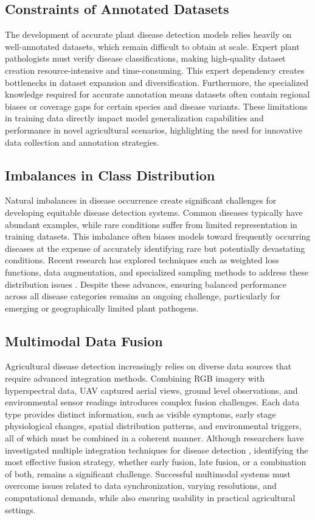 \documentclass[sn-mathphys]{sn-jnl}
\theoremstyle{thmstyleone}%
\theoremstyle{thmstyletwo}%
\theoremstyle{thmstylethree}%
\begin{document}
\subsection{Constraints of Annotated Datasets} 
The development of accurate plant disease detection models relies heavily on well-annotated datasets, which remain difficult to obtain at scale. Expert plant pathologists must verify disease classifications, making high-quality dataset creation resource-intensive and time-consuming. This expert dependency creates bottlenecks in dataset expansion and diversification. Furthermore, the specialized knowledge required for accurate annotation means datasets often contain regional biases or coverage gaps for certain species and disease variants. These limitations in training data directly impact model generalization capabilities and performance in novel agricultural scenarios, highlighting the need for innovative data collection and annotation strategies.

\subsection{Imbalances in Class Distribution} 
Natural imbalances in disease occurrence create significant challenges for developing equitable disease detection systems. Common diseases typically have abundant examples, while rare conditions suffer from limited representation in training datasets. This imbalance often biases models toward frequently occurring diseases at the expense of accurately identifying rare but potentially devastating conditions. Recent research has explored techniques such as weighted loss functions, data augmentation, and specialized sampling methods to address these distribution issues \citep{ahmad2021plant, sambasivam2021predictive, sunil2023tomato}. Despite these advances, ensuring balanced performance across all disease categories remains an ongoing challenge, particularly for emerging or geographically limited plant pathogens.

\subsection{Multimodal Data Fusion} 
Agricultural disease detection increasingly relies on diverse data sources that require advanced integration methods. Combining RGB imagery with hyperspectral data, UAV captured aerial views, ground level observations, and environmental sensor readings introduces complex fusion challenges. Each data type provides distinct information, such as visible symptoms, early stage physiological changes, spatial distribution patterns, and environmental triggers, all of which must be combined in a coherent manner. Although researchers have investigated multiple integration techniques for disease detection \citep{cao2023cucumber, patil2022rice, shafi2020multi}, identifying the most effective fusion strategy, whether early fusion, late fusion, or a combination of both, remains a significant challenge. Successful multimodal systems must overcome issues related to data synchronization, varying resolutions, and computational demands, while also ensuring usability in practical agricultural settings.
\end{document}
